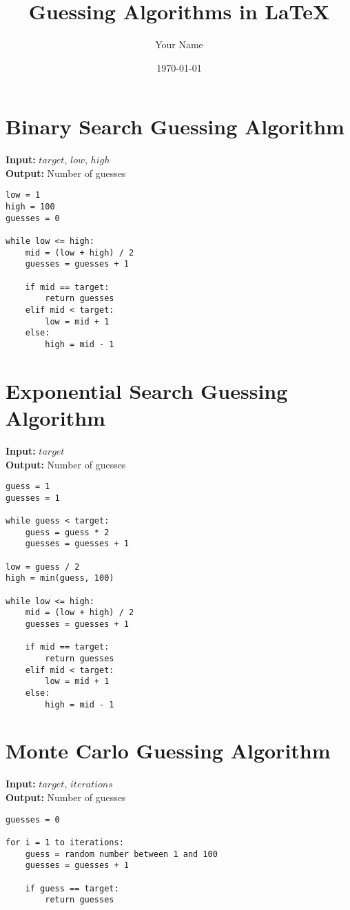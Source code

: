 \documentclass{article}
\title{Guessing Algorithms in LaTeX}
\author{Your Name}
\date{\today}
\begin{document}
\maketitle

\section{Binary Search Guessing Algorithm}
\textbf{Input:} $target$, $low$, $high$ \\
\textbf{Output:} Number of guesses

\begin{verbatim}
low = 1
high = 100
guesses = 0

while low <= high:
    mid = (low + high) / 2
    guesses = guesses + 1

    if mid == target:
        return guesses
    elif mid < target:
        low = mid + 1
    else:
        high = mid - 1
\end{verbatim}

\section{Exponential Search Guessing Algorithm}
\textbf{Input:} $target$ \\
\textbf{Output:} Number of guesses

\begin{verbatim}
guess = 1
guesses = 1

while guess < target:
    guess = guess * 2
    guesses = guesses + 1

low = guess / 2
high = min(guess, 100)

while low <= high:
    mid = (low + high) / 2
    guesses = guesses + 1

    if mid == target:
        return guesses
    elif mid < target:
        low = mid + 1
    else:
        high = mid - 1
\end{verbatim}

\section{Monte Carlo Guessing Algorithm}
\textbf{Input:} $target$, $iterations$ \\
\textbf{Output:} Number of guesses

\begin{verbatim}
guesses = 0

for i = 1 to iterations:
    guess = random number between 1 and 100
    guesses = guesses + 1

    if guess == target:
        return guesses
\end{verbatim}
\end{document}
